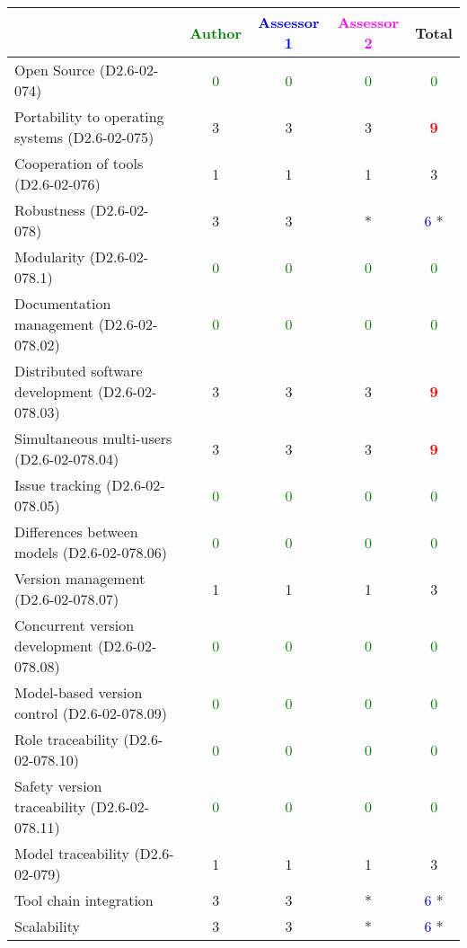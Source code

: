 \begin{tabular}{|l | c | c | c | c|}
\hline
& \textcolor{green}{Author} & \textcolor{blue}{Assessor 1} & \textcolor{magenta}{Assessor 2} & Total \\
\hline 
Open Source (D2.6-02-074) & \textcolor{green}{0}   & \textcolor{green}{0}   & \textcolor{green}{0} & \textcolor{green}{0}  \\
\hline 
Portability to operating systems (D2.6-02-075) &3 &3 & 3    &  \textcolor{red}{\textbf{9}} \\
\hline
Cooperation of tools (D2.6-02-076) &1 &1 & 1    & 3     \\
\hline
Robustness (D2.6-02-078) &3 &3 & *& \textcolor{blue}{6} * \\
\hline
Modularity (D2.6-02-078.1) & \textcolor{green}{0}   & \textcolor{green}{0}   & \textcolor{green}{0} & \textcolor{green}{0} \\
\hline
Documentation management (D2.6-02-078.02) & \textcolor{green}{0}   & \textcolor{green}{0}   & \textcolor{green}{0} & \textcolor{green}{0} \\
\hline
Distributed software development (D2.6-02-078.03)  &3 &3 & 3    & \textcolor{red}{\textbf{9}} \\
\hline
Simultaneous multi-users (D2.6-02-078.04)   &3 &3 & 3    & \textcolor{red}{\textbf{9}} \\
\hline
Issue tracking (D2.6-02-078.05) & \textcolor{green}{0}   & \textcolor{green}{0}   & \textcolor{green}{0} & \textcolor{green}{0} \\
\hline
Differences between models (D2.6-02-078.06) & \textcolor{green}{0}   & \textcolor{green}{0}   & \textcolor{green}{0} & \textcolor{green}{0} \\
\hline
Version management (D2.6-02-078.07) &1 &1 & 1    & 3     \\
\hline
Concurrent version development (D2.6-02-078.08) & \textcolor{green}{0}   & \textcolor{green}{0}   & \textcolor{green}{0} & \textcolor{green}{0} \\
\hline
Model-based version control (D2.6-02-078.09) & \textcolor{green}{0}   & \textcolor{green}{0}   & \textcolor{green}{0} & \textcolor{green}{0} \\
\hline
Role traceability (D2.6-02-078.10) & \textcolor{green}{0}   & \textcolor{green}{0}   & \textcolor{green}{0} & \textcolor{green}{0} \\
\hline
Safety version traceability (D2.6-02-078.11) & \textcolor{green}{0}   & \textcolor{green}{0}   & \textcolor{green}{0} & \textcolor{green}{0} \\
\hline
Model traceability (D2.6-02-079) &1 &1 & 1    & 3     \\
\hline
Tool chain integration &3 &3 & *& \textcolor{blue}{6} * \\
\hline
Scalability &3 &3 & * & \textcolor{blue}{6} *\\
\hline
\end{tabular}

